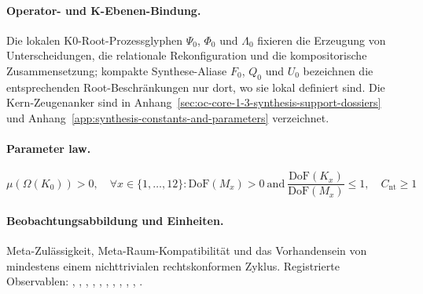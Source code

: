 \paragraph{Operator- und K-Ebenen-Bindung.}
Die lokalen K0-Root-Prozessglyphen \(\Psi_0\), \(\Phi_0\) und \(\Lambda_0\) fixieren die Erzeugung von Unterscheidungen, die relationale Rekonfiguration und die kompositorische Zusammensetzung; kompakte Synthese-Aliase \(F_0\), \(Q_0\) und \(U_0\) bezeichnen die entsprechenden Root-Beschränkungen nur dort, wo sie lokal definiert sind.
Die Kern-Zeugenanker sind in Anhang~\ref{sec:oc-core-1-3-synthesis-support-dossiers} und Anhang~\ref{app:synthesis-constants-and-parameters} verzeichnet.

\paragraph{Parameter law.}
\[
\mu(\Omega(K_0)) > 0,\quad \forall x \in \{1,\dots,12\}: \mathrm{DoF}(M_x)>0\ \mathrm{and}\ \frac{\mathrm{DoF}(K_x)}{\mathrm{DoF}(M_x)} \leq 1,\quad C_{\mathrm{nt}} \geq 1
\]

\paragraph{Beobachtungsabbildung und Einheiten.}
Meta-Zulässigkeit, Meta-Raum-Kompatibilität und das Vorhandensein von mindestens einem nichttrivialen rechtskonformen Zyklus.
Registrierte Observablen: , \allowbreak {}, \allowbreak {}, \allowbreak {}, \allowbreak {}, \allowbreak {}, \allowbreak {}, \allowbreak {}, \allowbreak {}, \allowbreak {}, \allowbreak {}.

